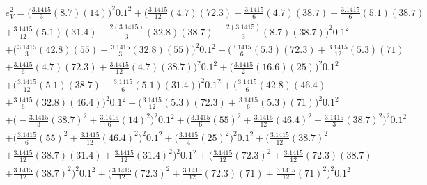 \documentclass[letter,11pt]{article}
\begin{document}
\begin{equation*}
\begin{split}
    e_V^2 = 
         \Biggl(
            \frac{3.1415}{3}(8.7)(14)
        \Biggr)^2{0.1}^2
        +\Biggl(
             \frac{3.1415}{12}(4.7)(72.3)
            +\frac{3.1415}{6}(4.7)(38.7)
            +\frac{3.1415}{6}(5.1)(38.7) \\
            +\frac{3.1415}{12}(5.1)(31.4)
            -\frac{2(3.1415)}{3}(32.8)(38.7)
            -\frac{2(3.1415)}{3}(8.7)(38.7)
        \Biggr)^2{0.1}^2 \\
        +\Biggl(
             \frac{3.1415}{3}(42.8)(55)
            +\frac{3.1415}{3}(32.8)(55)
        \Biggr)^2{0.1}^2
        +\Biggl(
             \frac{3.1415}{6}(5.3)(72.3)+\frac{3.1415}{12}(5.3)(71) \\
            +\frac{3.1415}{6}(4.7)(72.3)+\frac{3.1415}{12}(4.7)(38.7)
        \Biggr)^2{0.1}^2
        +\Biggl(
            \frac{3.1415}{2}(16.6)(25)
        \Biggr)^2{0.1}^2 \\
        +\Biggl(
             \frac{3.1415}{12}(5.1)(38.7)
            +\frac{3.1415}{6}(5.1)(31.4)
        \Biggr)^2{0.1}^2
        +\Biggl(
             \frac{3.1415}{6}(42.8)(46.4) \\
            +\frac{3.1415}{6}(32.8)(46.4)
        \Biggr)^2{0.1}^2
        +\Biggl(
             \frac{3.1415}{12}(5.3)(72.3)+\frac{3.1415}{6}(5.3)(71)
        \Biggr)^2{0.1}^2 \\
        +\Biggl(
            -\frac{3.1415}{3}(38.7)^2
            +\frac{3.1415}{6}(14)^2
        \Biggr)^2{0.1}^2
        +\Biggl(
            \frac{3.1415}{6}(55)^2+\frac{3.1415}{12}(46.4)^2-\frac{3.1415}{3}(38.7)^2
        \Biggr)^2{0.1}^2 \\
        +\Biggl(
            \frac{3.1415}{6}(55)^2+\frac{3.1415}{12}(46.4)^2
        \Biggr)^2{0.1}^2
        +\Biggl(
            \frac{3.1415}{4}(25)^2
        \Biggr)^2{0.1}^2
        +\Biggl(
             \frac{3.1415}{12}(38.7)^2 \\
            +\frac{3.1415}{12}(38.7)(31.4)
            +\frac{3.1415}{12}(31.4)^2
        \Biggr)^2{0.1}^2
        +\Biggl(
             \frac{3.1415}{12}(72.3)^2
            +\frac{3.1415}{12}(72.3)(38.7) \\
            +\frac{3.1415}{12}(38.7)^2
        \Biggr)^2{0.1}^2
        +\Biggl(
             \frac{3.1415}{12}(72.3)^2
            +\frac{3.1415}{12}(72.3)(71)
            +\frac{3.1415}{12}(71)^2
        \Biggr)^2{0.1}^2
\end{split}
\end{equation*}
\end{document}
